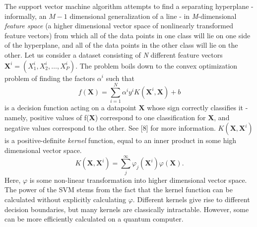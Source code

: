 \documentclass[twocolumn, english]{revtex4-2}
\begin{document}
The support vector machine algorithm attempts to find a separating hyperplane - informally, an $\textit{M}-1$ dimensional generalization of a line - in \textit{M}-dimensional \textit{feature space} (a higher dimensional vector space of nonlinearly transformed feature vectors) from which all of the data points in one class will lie on one side of the hyperplane, and all of the data points in the other class will lie on the other. Let us consider a dataset consisting of \textit{N} different feature vectors $\textbf{X}^{i} = (\textit{X}^{i}_{1}, \textit{X}^{i}_{2}, …, \textit{X}^{i}_{P})$. The problem boils down to the convex optimization problem of finding the factors $\alpha^{i}$ such that \begin{equation}f(\textbf{X})=\sum_{i=1}^{N}\alpha^{i}y^{i}K(\textbf{X}^{i}, \textbf{X})+b\end{equation} is a decision function acting on a datapoint $\textbf{X}$ whose sign correctly classifies it - namely, positive values of f(\textbf{X}) correspond to one classification for \textbf{X}, and negative values correspond to the other. See [8] for more information. $\textit{K}(\textbf{X}, \textbf{X}^{i})$ is a positive-definite \textit{kernel} function, equal to an inner product in some high dimensional vector space. \begin{equation}\textit{K}(\textbf{X}, \textbf{X}^{i})=\sum_{j}^{\infty}\varphi_{j}(\textbf{X}^{i})\varphi(\textbf{X}).\end{equation} Here, $\varphi$ is some non-linear transformation into higher dimensional vector space. The power of the SVM stems from the fact that the kernel function can be calculated without explicitly calculating $\varphi$. Different kernels give rise to different decision boundaries, but many kernels are classically intractable. However, some can be more efficiently calculated on a quantum computer.
\end{document}
